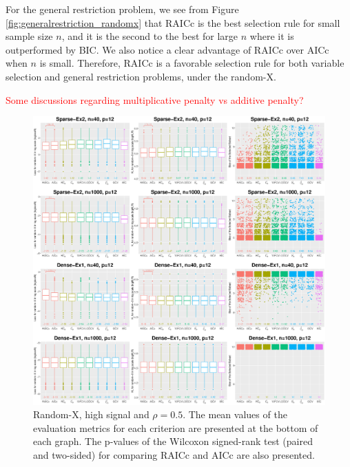 For the general restriction problem, we see from Figure \ref{fig:generalrestriction_randomx} that RAICc is the best selection rule for small sample size $n$, and it is the second to the best for large $n$ where it is outperformed by BIC. We also notice a clear advantage of RAICc over AICc when $n$ is small. Therefore, RAICc is a favorable selection rule for both variable selection and general restriction problems, under the random-X.

\textcolor{red}{Some discussions regarding multiplicative penalty vs additive penalty?}

\iffalse
\begin{figure}[!ht]
  \centering
  \includegraphics[width=\textwidth]{figures/main/randomx/subset_selection/smallp_hsnr.eps}
  \caption{Random-X, high signal and $\rho=0.5$. The mean values of the evaluation metrics for each criterion are presented at the bottom of each graph. The p-values of the Wilcoxon signed-rank test (paired and two-sided) for comparing RAICc and AICc are also presented.}
  \label{fig:subsetselection_randomx_hsnr_smallp}
\end{figure}

